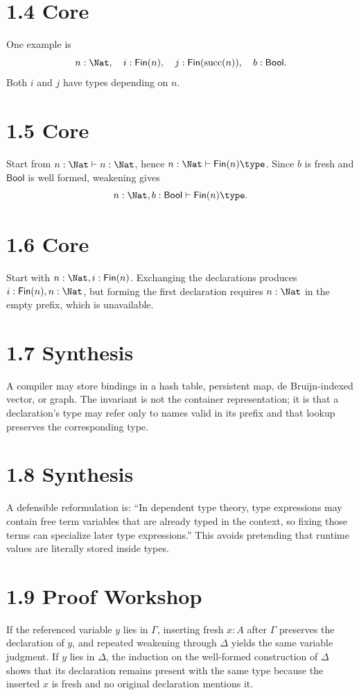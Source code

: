 \documentclass[11pt,openany]{book}
\begin{document}
\section*{1.4 Core}
One example is
\[
 n:\Nat,\quad i:\Fin(n),\quad j:\Fin(\mathrm{succ}(n)),\quad b:\mathsf{Bool}.
\]
Both $i$ and $j$ have types depending on $n$.

\section*{1.5 Core}
Start from $n:\Nat\vdash n:\Nat$, hence $n:\Nat\vdash\Fin(n)\type$. Since $b$ is fresh and $\mathsf{Bool}$ is well formed, weakening gives
\[
 n:\Nat,b:\mathsf{Bool}\vdash \Fin(n)\type.
\]

\section*{1.6 Core}
Start with $n:\Nat,i:\Fin(n)$. Exchanging the declarations produces $i:\Fin(n),n:\Nat$, but forming the first declaration requires $n:\Nat$ in the empty prefix, which is unavailable.

\section*{1.7 Synthesis}
A compiler may store bindings in a hash table, persistent map, de Bruijn-indexed vector, or graph. The invariant is not the container representation; it is that a declaration's type may refer only to names valid in its prefix and that lookup preserves the corresponding type.

\section*{1.8 Synthesis}
A defensible reformulation is: ``In dependent type theory, type expressions may contain free term variables that are already typed in the context, so fixing those terms can specialize later type expressions.'' This avoids pretending that runtime values are literally stored inside types.

\section*{1.9 Proof Workshop}
If the referenced variable $y$ lies in $\Gamma$, inserting fresh $x:A$ after $\Gamma$ preserves the declaration of $y$, and repeated weakening through $\Delta$ yields the same variable judgment. If $y$ lies in $\Delta$, the induction on the well-formed construction of $\Delta$ shows that its declaration remains present with the same type because the inserted $x$ is fresh and no original declaration mentions it.
\end{document}
